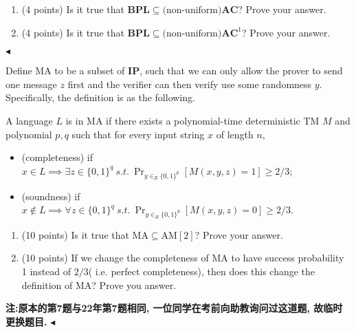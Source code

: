 \documentclass[11pt]{article}
\newenvironment{problem}[2][Question]{\begin{trivlist}
\item[\hskip \labelsep{\bfseries#1}\hskip\labelsep{\bfseries#2.}]}{\hfill$\blacktriangleleft$\end{trivlist}}
\newcommand{\IP}{\mathbf{IP}}
\begin{document}
\newpage
\begin{problem}{6.(18 points)}
    $~$
    \begin{enumerate}[label = (\alph*)]
        \item (4 points) Is it true that $\mathbf{BPL} \subseteq \text{(non-uniform)}\mathbf{AC}$? Prove your answer.
        \item (4 points) Is it true that $\mathbf{BPL} \subseteq \text{(non-uniform)}\mathbf{AC}^1$? Prove your answer.
    \end{enumerate}
\end{problem}
\newpage
\begin{problem}{7.(20 points)}
Define MA to be a subset of $\IP$, such that we can only allow the prover to send one message $z$ first and the verifier can then verify use some randomness $y$. Specifically, the definition is as the following.

A language $L$ is in MA if there exists a polynomial-time deterministic TM $M$ and polynomial $p,q$ such that for every input string $x$ of length $n$,
\begin{itemize}
    \item (completeness) if $x\in L \implies \exists z \in \{0,1\}^q ~s.t.~ \Pr_{y \in_{R} \{0,1\}^p}[M(x,y,z) = 1]\ge 2/3$;
    \item (soundness) if $x\notin L \implies \forall z \in \{0,1\}^q ~s.t.~ \Pr_{y \in_{R} \{0,1\}^p}[M(x,y,z) = 0]\ge 2/3$.
\end{itemize}
\begin{enumerate}[label = (\alph*)]
    \item (10 points) Is it true that $\text{MA} \subseteq \text{AM}[2]$? Prove your answer.
    \item (10 points) If we change the completeness of MA to have success probability 1 instead of $2/3$( i.e. perfect completeness), then does this change the definition of MA? Prove you answer.
\end{enumerate}
{\bf 注:原本的第7题与22年第7题相同, 一位同学在考前向助教询问过这道题, 故临时更换题目.}
\end{problem}
\end{document}
